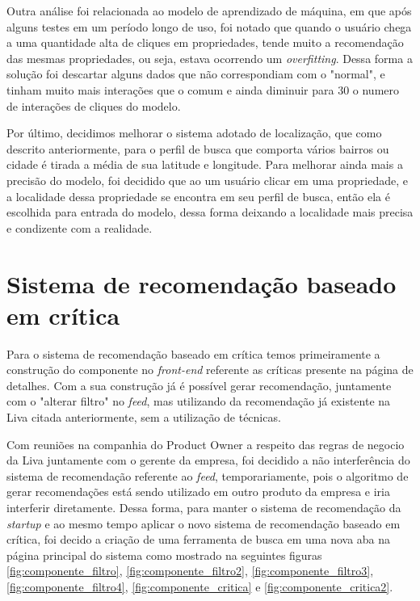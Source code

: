 Outra análise foi relacionada ao modelo de aprendizado de máquina, em que após alguns testes em um período longo de uso, foi notado que quando o usuário chega a uma quantidade alta de cliques em propriedades, tende muito a recomendação das mesmas propriedades, ou seja, estava ocorrendo um \textit{overfitting}. Dessa forma a solução foi descartar alguns dados que não correspondiam com o "normal", e tinham muito mais interações  que o comum e ainda diminuir para 30 o numero de interações de cliques do modelo.

Por último, decidimos melhorar o sistema adotado de localização, que como descrito anteriormente, para o perfil de busca que comporta vários bairros ou cidade é tirada a média de sua latitude e longitude. Para melhorar ainda mais a precisão do modelo, foi decidido que ao um usuário clicar em uma propriedade, e a localidade dessa propriedade se encontra em seu perfil de busca, então ela é escolhida para entrada do modelo, dessa forma deixando a localidade mais precisa e condizente com a realidade.

\section{Sistema de recomendação baseado em crítica}

Para o sistema de recomendação baseado em crítica temos primeiramente a construção do componente no \textit{front-end} referente as críticas presente na página de detalhes. Com a sua construção já é possível gerar recomendação, juntamente com o "alterar filtro" no \textit{feed}, mas utilizando da recomendação já existente na Liva citada anteriormente, sem a utilização de técnicas.

Com reuniões na companhia do Product Owner a respeito das regras de negocio da Liva juntamente com o gerente da empresa, foi decidido a não interferência do sistema de recomendação referente ao \textit{feed}, temporariamente, pois o algoritmo de gerar recomendações está sendo utilizado em outro produto da empresa e iria interferir diretamente. Dessa forma, para manter o sistema de recomendação da \textit{startup} e ao mesmo tempo aplicar o novo sistema de recomendação baseado em crítica, foi decido a criação de uma ferramenta de busca em uma nova aba na página principal do sistema como mostrado na seguintes figuras \ref{fig:componente_filtro}, \ref{fig:componente_filtro2}, \ref{fig:componente_filtro3}, \ref{fig:componente_filtro4}, \ref{fig:componente_critica} e \ref{fig:componente_critica2}.

